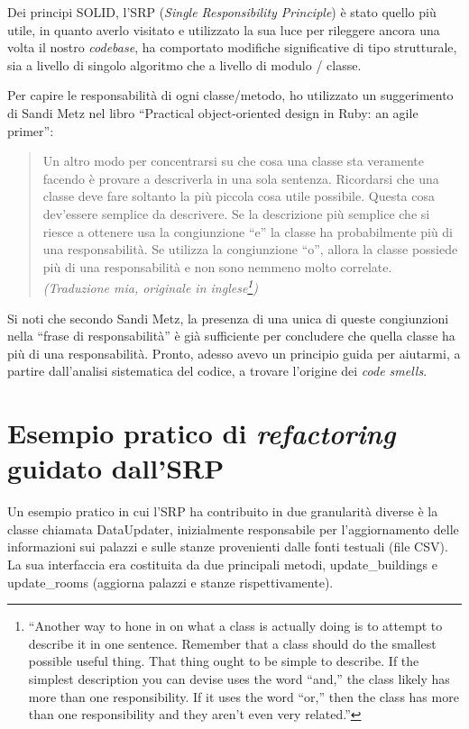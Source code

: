 \documentclass[12pt]{report}
\begin{document}
Dei principi SOLID, l'SRP (\textit{Single Responsibility Principle})
è stato quello più utile, in quanto averlo visitato e utilizzato la sua luce
per rileggere ancora una volta il nostro \textit{codebase}, ha comportato 
modifiche significative di tipo strutturale, sia a livello di singolo 
algoritmo che a livello di modulo / classe.

Per capire le responsabilità di ogni classe/metodo, ho utilizzato un
suggerimento di Sandi Metz nel libro ``Practical object-oriented 
design in Ruby: an agile primer'':

\begin{quote}
Un altro modo per concentrarsi su che cosa una classe sta veramente facendo
è provare a descriverla in una sola sentenza. Ricordarsi che una classe deve
fare soltanto la più piccola cosa utile possibile. Questa cosa dev'essere
semplice da descrivere. Se la descrizione più semplice che si riesce a
ottenere usa la congiunzione ``e'' la classe ha probabilmente più di una
responsabilità. Se utilizza la congiunzione ``o'', allora la classe
possiede più di una responsabilità e non sono nemmeno molto correlate. \cite{metz2013}
\flushright
\textit{(Traduzione mia, originale in inglese\footnote{
``Another way to hone in on what a class is actually doing is to attempt 
to describe it in one sentence. Remember that a class should do 
the smallest possible useful thing. That thing ought to be simple 
to describe. If the simplest description you can devise uses the word ``and,'' 
the class likely has more than one responsibility. If it uses the word ``or,'' 
then the class has more than one responsibility and they aren’t 
even very related.''})
}
\end{quote}

Si noti che secondo Sandi Metz, la presenza di
una unica di queste congiunzioni nella ``frase di responsabilità''
è già sufficiente per concludere che
quella classe ha più di una responsabilità. Pronto, adesso avevo un
principio guida per aiutarmi, a partire dall'analisi sistematica del codice,
a trovare l'origine dei \textit{code smells}.

\section{Esempio pratico di \textit{refactoring} guidato dall'SRP}

Un esempio pratico in cui l'SRP ha contribuito in due granularità diverse è la
classe chiamata DataUpdater, inizialmente responsabile per l'aggiornamento 
delle informazioni sui palazzi e sulle stanze provenienti dalle fonti testuali 
(file CSV). La sua interfaccia era costituita da due principali 
metodi, update\_buildings e update\_rooms (aggiorna palazzi e stanze 
rispettivamente).
\end{document}
